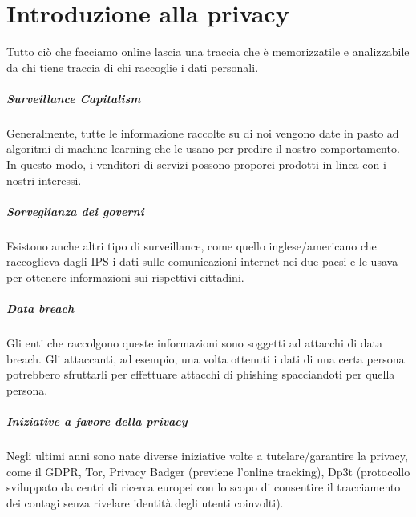 \chapter{Introduzione alla privacy}

Tutto ciò che facciamo online lascia una traccia che è memorizzatile e analizzabile da chi tiene traccia di chi raccoglie i dati personali.

\paragraph{Surveillance Capitalism} Generalmente, tutte le informazione raccolte su di noi vengono date in pasto ad algoritmi di machine learning che le usano per predire il nostro comportamento. In questo modo, i venditori di servizi possono proporci prodotti in linea con i nostri interessi.

\paragraph{Sorveglianza dei governi} Esistono anche altri tipo di surveillance, come quello inglese/americano che raccoglieva dagli IPS i dati sulle comunicazioni internet nei due paesi e le usava per ottenere informazioni sui rispettivi cittadini.

\paragraph{Data breach} Gli enti che raccolgono queste informazioni sono soggetti ad attacchi di data breach. Gli attaccanti, ad esempio, una volta ottenuti i dati di una certa persona potrebbero sfruttarli per effettuare attacchi di phishing spacciandoti per quella persona.

\paragraph{Iniziative a favore della privacy} Negli ultimi anni sono nate diverse iniziative volte a tutelare/garantire la privacy, come il GDPR, Tor, Privacy Badger (previene l'online tracking), Dp3t (protocollo sviluppato da centri di ricerca europei con lo scopo di consentire il tracciamento dei contagi senza rivelare identità degli utenti coinvolti).

